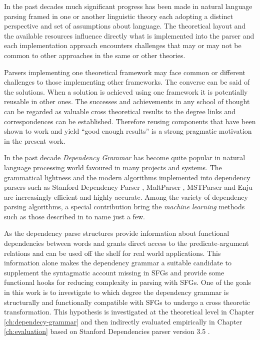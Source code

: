 In the past decades much significant progress has been made in natural language parsing framed in one or another linguistic theory each adopting a distinct perspective and set of assumptions about language. The theoretical layout and the available resources influence directly what is implemented into the parser and each implementation approach encounters challenges that may or may not be common to other approaches in the same or other theories. 

Parsers implementing one theoretical framework may face common or different challenges to those implementing other frameworks. The converse can be said of the solutions. When a solution is achieved using one framework it is potentially reusable in other ones. The successes and achievements in any school of thought can be regarded as valuable cross theoretical results to the degree links and correspondences can be established. Therefore reusing components that have been shown to work and yield ``good enough results'' is a strong pragmatic motivation in the present work.


%
In the past decade \textit{Dependency Grammar} \citep{Tesniere2015} has become quite popular in natural language processing world favoured in many projects and systems. The grammatical lightness and the  modern algorithms implemented into dependency parsers such as Stanford Dependency Parser \citep{Marneffe2006}, MaltParser \citep{Nivre2006}, MSTParser \citep{McDonald2006} and Enju \citep{Miyao2005} are increasingly efficient and highly accurate. Among the variety of dependency parsing algorithms, a special contribution bring the \textit{machine learning} methods such as those described in \citet{mcdonald2005online, mcdonald2006online, carreras2007experiments, zhang2011transition, pei2015effective} to name just a few. 

As the dependency parse structures provide information about functional dependencies between words and grants direct access to the predicate-argument relations and can be used off the shelf for real world applications. 
This information alone makes the dependency grammar a suitable candidate to supplement the syntagmatic account missing in SFGs and provide some functional hooks for reducing complexity in parsing with SFGs. One of the goals in this work is to investigate to which degree the dependency grammar is structurally and functionally compatible with SFGs to undergo a cross theoretic transformation. This hypothesis is investigated at the theoretical level in Chapter \ref{ch:dependecy-grammar} and then indirectly evaluated empirically in Chapter \ref{ch:evaluation} based on Stanford Dependencies parser version 3.5 \citep{Marneffe2008a,Marneffe2008, Marneffe2014}. 

